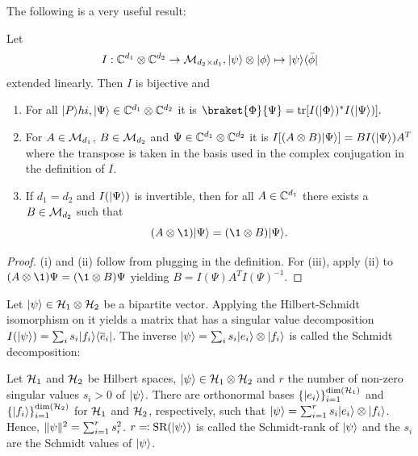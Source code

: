 The following is a very useful result:
\begin{prop}\label{hilbert-schmidt}
Let 
\begin{align*}
I: \mathbb{C}^{d_1} \otimes \mathbb{C}^{d_2} \to \mathcal M_{d_2\times d_1}, 
\lvert\psi\rangle \otimes \lvert\phi\rangle \mapsto \lvert\psi\rangle\langle\bar{\phi}\rvert
\end{align*}
extended linearly. Then $I$ is bijective and
\begin{enumerate}
\item[(i)] For all $ \lvert P\rangle hi, \lvert\Psi\rangle \in \mathbb{C}^{d_1} \otimes \mathbb{C}^{d_2}$ it is $
\braket{ \Phi}{\Psi} = \operatorname{tr}[I(\ket \Phi)^* I(\ket \Psi)].
$
    \item[(ii)] For $A \in \mathcal M_{d_1}$, $B \in \mathcal M_{d_2}$ and $\Psi \in \mathbb{C}^{d_1}\otimes \mathbb{C}^{d_2}$ it is $
    I[(A \otimes B)\lvert\Psi\rangle] = B I(\lvert\Psi\rangle) A^T$
    where the transpose is taken in the basis used in the complex conjugation in the definition of $I$.
    
    \item[(iii)] If $d_1=d_2$ and $I(\lvert\Psi\rangle)$ is invertible, then for all $A \in \mathbb{C}^{d_1}$ there exists a $B \in \mathcal M_{d_2}$ such that
    \[
    (A \otimes \1)\ket\Psi = (\1\otimes B)\ket \Psi.
    \]{}
\end{enumerate}
\end{prop}
\begin{proof}\mbox{} %
(i) and (ii) follow from plugging in the definition. For (iii), apply (ii) to $(A\otimes \1)\Psi = (\1 \otimes B)\Psi$ yielding $B=I(\Psi)A^TI(\Psi)^{-1}$.

\end{proof}\noindent
Let $\lvert\psi\rangle \in \mathcal{H}_1 \otimes \mathcal{H}_2$ be a bipartite vector. Applying the Hilbert-Schmidt isomorphism on it yields a matrix that has a singular value decomposition $I(\lvert\psi\rangle) = \sum_i s_i \lvert f_i\rangle\langle\overline e_i\rvert$. The inverse $\lvert\psi\rangle = \sum_i s_i \lvert e_i\rangle\otimes \lvert f_i\rangle$ is called the Schmidt decomposition:
\begin{prop}
    Let $\mathcal{H}_1$ and $\mathcal{H}_2$ be Hilbert spaces, $\lvert\psi\rangle \in \mathcal{H}_1 \otimes \mathcal{H}_2$ and $r$ the number of non-zero singular values $s_i >0$ of $\lvert\psi\rangle$. There are orthonormal bases $\{\lvert e_i\rangle\}_{i=1}^{\mathrm{dim}(\mathcal{H}_1)}$ and $\{\lvert f_i\rangle\}_{i=1}^{\mathrm{dim} (\mathcal{H}_2)}$ for $\mathcal{H}_1$ and $\mathcal{H}_2$, respectively, such that $
        \lvert\psi\rangle = \sum_{i=1}^r s_i \lvert e_i\rangle\otimes \lvert f_i\rangle$. Hence, $\lVert\psi\rVert ^2 = \sum_{i=1}^r s_i^2$. $r\eqqcolon \text{SR}(\lvert\psi\rangle)$ is called the Schmidt-rank of $\lvert\psi\rangle$ and the $s_i$ are the Schmidt values of $\lvert\psi\rangle$.{}
 \end{prop}\noindent
